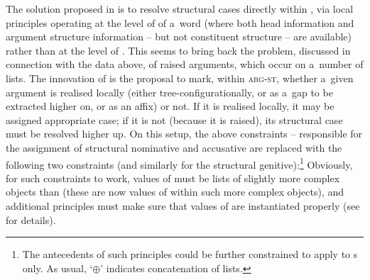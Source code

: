 \documentclass[output=paper
	        ,collection
	        ,collectionchapter
 	        ,biblatex
                ,babelshorthands
                ,newtxmath
                ,draftmode
                ,colorlinks, citecolor=brown
]{langscibook}
\begin{document}
The solution proposed in \citet{prze:96,Prze99b,Prze99} is to resolve structural cases directly within , via local principles operating at the level of  of a~word (where both head information and argument structure information – but not constituent structure – are available) rather than at the level of .  This seems to bring back the problem, discussed in connection with the  data above, of raised arguments, which occur on a~number of  lists.  The innovation of \citet{prze:96,Prze99b,Prze99} is the proposal to mark, within \textsc{arg-st}, whether a~given argument is realised locally (either tree-con\-fi\-gu\-ra\-tio\-nal\-ly, or as a~gap to be extracted higher on, or as an affix) or not.  If it is realised locally, it may be assigned appropriate case; if it is not (because it is raised), its structural case must be resolved higher up.  On this setup, the above constraints – responsible for the assignment of structural nominative and accusative are replaced with the following two constraints (and similarly for the structural genitive):\footnote{The antecedents of such principles could be further constrained to apply to s only. As usual, `$\oplus$' indicates concatenation of lists.}
\ea
\label{nonc:cp:germ1}
\ex \label{nonc:cp:germ2}
\z
Obviously, for such constraints to work, values of  must be lists of slightly more complex objects than  (these are now values of  within such more complex objects), and additional principles must make sure that values of  are instantiated properly (see \citealt[78–79]{Prze99b} for details).
\end{document}

